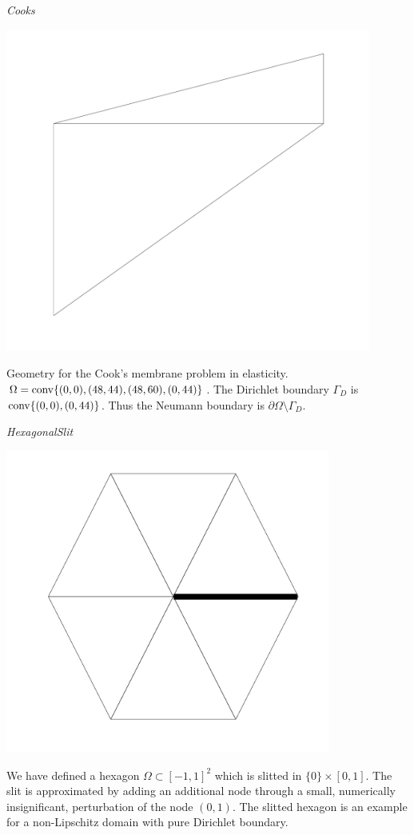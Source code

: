 \noindent\emph{Cooks}\smallskip\\
\begin{minipage}{0.14\textwidth}
\includegraphics[width=0.9\textwidth]{images/sect_ImplementedProblems_Cooks.pdf}
\end{minipage}
\begin{minipage}{0.85\textwidth}
Geometry for the Cook's membrane problem in elasticity. $\Omega=\operatorname{conv}\{(0,0),(48,44),(48,60),(0,44)\}$. The Dirichlet boundary $\Gamma_D$ is $\operatorname{conv}\{(0,0),(0,44)\}$. Thus the Neumann boundary is $\partial\Omega\setminus\Gamma_D$.
\end{minipage}
\bigskip

\noindent\emph{HexagonalSlit}\smallskip\\
\begin{minipage}{0.14\textwidth}
\includegraphics[width=0.8\textwidth]{images/sect_ImplementedProblems_HexagonalSlit.pdf}
\end{minipage}
\begin{minipage}{0.85\textwidth}
We have defined a hexagon $\Omega\subset[-1,1]^2$ which is slitted in $\{0\}\times[0,1]$. The slit is approximated by adding an additional node through a small, numerically insignificant, perturbation of the node $(0,1)$. The slitted hexagon is an example for a non-Lipschitz domain with pure Dirichlet boundary.
\end{minipage}
\bigskip